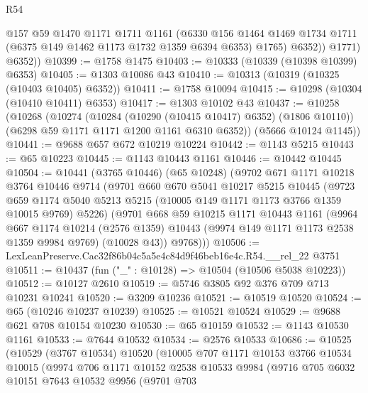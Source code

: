 \begin{lexlean}{R54}
\begin{coremodule}
              @157
              @59
              @1470
              @1171
              @1711
              @1161
              (@6330
                @156
                @1464
                @1469
                @1734
                @1711
                (@6375 @149 @1462 @1173 @1732 @1359 @6394 @6353)
                @1765)
              @6352))
          @1771)
        @6352))
@10399 := @1758 @1475
@10403 := @10333 (@10339 (@10398 @10399) @6353)
@10405 := @1303 @10086 @43
@10410 := @10313 (@10319 (@10325 (@10403 @10405) @6352))
@10411 := @1758 @10094
@10415 := @10298 (@10304 (@10410 @10411) @6353)
@10417 := @1303 @10102 @43
@10437 := @10258
    (@10268
      (@10274
        (@10284 (@10290 (@10415 @10417) @6352) (@1806 @10110))
        (@6298 @59 @1171 @1171 @1200 @1161 @6310 @6352))
      (@5666 @10124 @1145))
@10441 := @9688 @657 @672 @10219 @10224
@10442 := @1143 @5215
@10443 := @65 @10223
@10445 := @1143 @10443 @1161
@10446 := @10442 @10445
@10504 := @10441
    (@3765 @10446)
    (@65 @10248)
    (@9702
      @671
      @1171
      @10218
      @3764
      @10446
      @9714
      (@9701
        @660
        @670
        @5041
        @10217
        @5215
        @10445
        (@9723
          @659
          @1174
          @5040
          @5213
          @5215
          (@10005 @149 @1171 @1173 @3766 @1359 @10015 @9769)
          @5226)
        (@9701
          @668
          @59
          @10215
          @1171
          @10443
          @1161
          (@9964
            @667
            @1174
            @10214
            (@2576 @1359)
            @10443
            (@9974 @149 @1171 @1173 @2538 @1359 @9984 @9769)
            (@10028 @43))
          @9768)))
@10506 := LexLeanPreserve.Cac32f86b04c5a5e4c84d9f46beb16e4c.R54.__rel_22 @3751
@10511 := @10437 (fun ("_" : @10128) => @10504 (@10506 @5038 @10223))
@10512 := @10127 @2610
@10519 := @5746 @3805 @92 @376 @709 @713 @10231 @10241
@10520 := @3209 @10236
@10521 := @10519 @10520
@10524 := @65 (@10246 @10237 @10239)
@10525 := @10521 @10524
@10529 := @9688 @621 @708 @10154 @10230
@10530 := @65 @10159
@10532 := @1143 @10530 @1161
@10533 := @7644 @10532
@10534 := @2576 @10533
@10686 := @10525
    (@10529
      (@3767 @10534)
      @10520
      (@10005
        @707
        @1171
        @10153
        @3766
        @10534
        @10015
        (@9974
          @706
          @1171
          @10152
          @2538
          @10533
          @9984
          (@9716
            @705
            @6032
            @10151
            @7643
            @10532
            @9956
            (@9701
              @703

\end{coremodule}
\end{lexlean}
